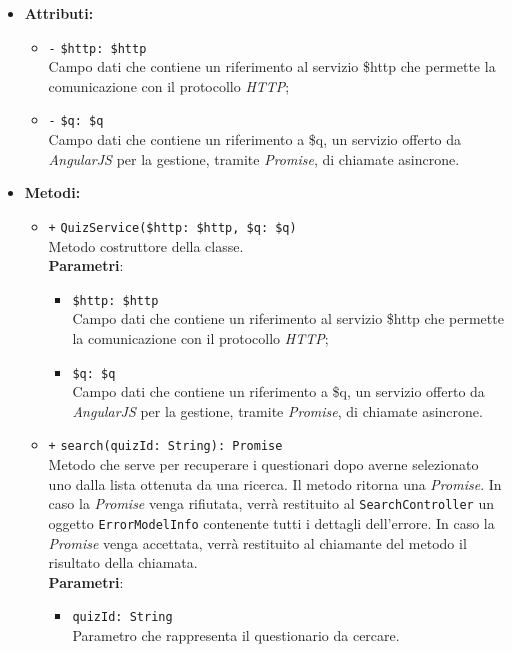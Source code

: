 \begin{itemize}
\begin{itemize}
	\end{itemize}
	\item \textbf{Attributi:}
	\begin{itemize}
		\item \texttt{-} \texttt{\$http: \$http} \\ Campo dati che contiene un riferimento al servizio \$http che permette la comunicazione con il protocollo \textit{HTTP};
		\item \texttt{-} \texttt{\$q: \$q} \\ Campo dati che contiene un riferimento a \$q, un servizio offerto da \textit{AngularJS} per la gestione, tramite \textit{Promise}, di chiamate asincrone.
	\end{itemize}
	\item \textbf{Metodi:} 
	\begin{itemize}
		\item \texttt{+} \texttt{QuizService(\$http: \$http, \$q: \$q)} \\ Metodo costruttore della classe. \\
		\textbf{Parametri}:
		\begin{itemize}
			\item \texttt{\$http: \$http} \\ Campo dati che contiene un riferimento al servizio \$http che permette la comunicazione con il protocollo \textit{HTTP};
			\item \texttt{\$q: \$q} \\ Campo dati che contiene un riferimento a \$q, un servizio offerto da \textit{AngularJS} per la gestione, tramite \textit{Promise}, di chiamate asincrone. 
		\end{itemize}
	\item \texttt{+} \texttt{search(quizId: String): Promise} \\Metodo che serve per recuperare i questionari dopo averne selezionato uno dalla lista ottenuta da una ricerca. Il metodo ritorna una \textit{Promise}. In caso la \textit{Promise} venga rifiutata, verrà restituito al \texttt{SearchController} un oggetto \texttt{ErrorModelInfo} contenente tutti i dettagli dell'errore. In caso la \textit{Promise} venga accettata, verrà restituito al chiamante del metodo il risultato della chiamata.\\
	\textbf{Parametri}:
	\begin{itemize}
		\item \texttt{quizId: String} \\ Parametro che rappresenta il questionario da cercare.

\end{itemize}
\end{itemize}
\end{itemize}
